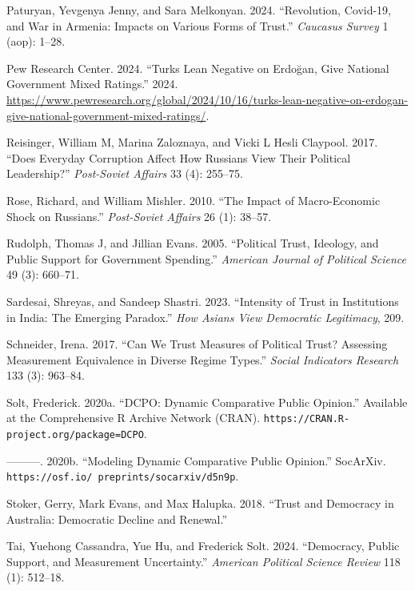\documentclass[
  12pt,
]{article}
\newlength{\cslhangindent}
\newenvironment{CSLReferences}[2] %
 {\begin{list}{}{%
  \setlength{\itemindent}{0pt}
  \setlength{\leftmargin}{0pt}
  \setlength{\parsep}{0pt}
  \ifodd #1
   \setlength{\leftmargin}{\cslhangindent}
   \setlength{\itemindent}{-1\cslhangindent}
  \fi
  \setlength{\itemsep}{#2\baselineskip}}}
 {\end{list}}
\begin{document}
\begin{CSLReferences}{1}{0}
Paturyan, Yevgenya Jenny, and Sara Melkonyan. 2024. {``Revolution, Covid-19, and War in Armenia: Impacts on Various Forms of Trust.''} \emph{Caucasus Survey} 1 (aop): 1--28.

Pew Research Center. 2024. {``Turks Lean Negative on Erdoğan, Give National Government Mixed Ratings.''} 2024. \url{https://www.pewresearch.org/global/2024/10/16/turks-lean-negative-on-erdogan-give-national-government-mixed-ratings/}.

Reisinger, William M, Marina Zaloznaya, and Vicki L Hesli Claypool. 2017. {``Does Everyday Corruption Affect How Russians View Their Political Leadership?''} \emph{Post-Soviet Affairs} 33 (4): 255--75.

Rose, Richard, and William Mishler. 2010. {``The Impact of Macro-Economic Shock on Russians.''} \emph{Post-Soviet Affairs} 26 (1): 38--57.

Rudolph, Thomas J, and Jillian Evans. 2005. {``Political Trust, Ideology, and Public Support for Government Spending.''} \emph{American Journal of Political Science} 49 (3): 660--71.

Sardesai, Shreyas, and Sandeep Shastri. 2023. {``Intensity of Trust in Institutions in India: The Emerging Paradox.''} \emph{How Asians View Democratic Legitimacy}, 209.

Schneider, Irena. 2017. {``Can We Trust Measures of Political Trust? Assessing Measurement Equivalence in Diverse Regime Types.''} \emph{Social Indicators Research} 133 (3): 963--84.

Solt, Frederick. 2020a. {``{DCPO}: Dynamic Comparative Public Opinion.''} Available at the Comprehensive R Archive Network (CRAN). \texttt{https://CRAN.R-project.org/package=DCPO}.

---------. 2020b. {``Modeling Dynamic Comparative Public Opinion.''} SocArXiv. \texttt{https://osf.io/\ preprints/socarxiv/d5n9p}.

Stoker, Gerry, Mark Evans, and Max Halupka. 2018. {``Trust and Democracy in Australia: Democratic Decline and Renewal.''}

Tai, Yuehong Cassandra, Yue Hu, and Frederick Solt. 2024. {``Democracy, Public Support, and Measurement Uncertainty.''} \emph{American Political Science Review} 118 (1): 512--18.


\end{CSLReferences}
\end{document}
